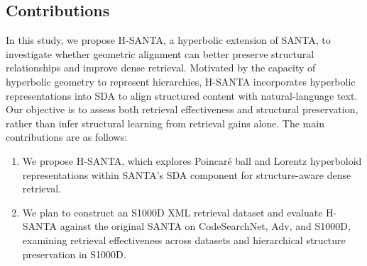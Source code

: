 \subsection{Contributions}
In this study, we propose H-SANTA, a hyperbolic extension of SANTA, to investigate whether geometric alignment can better preserve structural relationships and improve dense retrieval. Motivated by the capacity of hyperbolic geometry to represent hierarchies, H-SANTA incorporates hyperbolic representations into SDA to align structured content with natural-language text. Our objective is to assess both retrieval effectiveness and structural preservation, rather than infer structural learning from retrieval gains alone. The main contributions are as follows:
\begin{enumerate}
    \item We propose H-SANTA, which explores Poincar\'e ball and Lorentz hyperboloid representations within SANTA's SDA component for structure-aware dense retrieval.
    \item We plan to construct an S1000D XML retrieval dataset and evaluate H-SANTA against the original SANTA on CodeSearchNet, Adv, and S1000D, examining retrieval effectiveness across datasets and hierarchical structure preservation in S1000D.
\end{enumerate}
